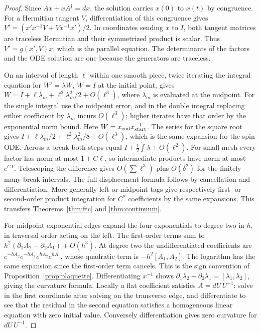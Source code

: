 \documentclass[11pt,reqno]{amsart}
\theoremstyle{definition}
\theoremstyle{remark}
\numberwithin{equation}{section}
\begin{document}
\begin{proof}
Since \(Ax+xA^\dagger=dx\), the solution carries \(x(0)\)
to \(x(t)\) by congruence. For a Hermitian tangent \(V\),
differentiation of this congruence gives
\(V'=(x'x^{-1}V+Vx^{-1}x')/2\).
In coordinates sending \(x\) to \(I\), both tangent matrices are
traceless Hermitian and their symmetrized product is scalar.
Thus \(V'=g(x',V)x\), which is the parallel equation.
The determinants of the factors and the ODE solution are one
because the generators are traceless.

On an interval of length \(\ell\) within one smooth piece, twice
iterating the integral equation for \(W'=\lambda W\), \(W=I\)
at the initial point, gives
\(W=I+\ell\lambda_m+\ell^2\lambda_m^2/2+O(\ell^3)\),
where \(\lambda_m\) is evaluated at the midpoint. For the single
integral use the midpoint error, and in the double integral
replacing either coefficient by \(\lambda_m\) incurs \(O(\ell^3)\);
higher iterates have that order by the exponential norm bound.
Here \(W=x_{\rm end}x_{\rm start}^{-1}\).
The series for the square root gives
\(I+\ell\lambda_m/2+\ell^2\lambda_m^2/8+O(\ell^3)\),
which is the same expansion for the spin ODE.
Across a break both steps equal
\(I+\tfrac12\int\lambda+O(\ell^2)\).
For small mesh every factor has norm at most \(1+C\ell\),
so intermediate products have norm at most \(e^{CT}\).
Telescoping the difference gives \(O(\sum\ell^3)\) plus
\(O(\delta^2)\) for the finitely many break intervals.
The full-displacement formula follows by cancellation and
differentiation. More generally left or midpoint tags
give respectively first- or second-order product integration
for \(C^2\) coefficients by the same expansions.
This transfers Theorems~\ref{thm:ftc} and \ref{thm:continuum}.

For midpoint exponential edges expand the four exponentials to
degree two in \(h\), in traversal order acting on the left.
The first-order terms sum to
\(h^2(\partial_1A_2-\partial_2A_1)+O(h^3)\).
At degree two the undifferentiated coefficients are
\(e^{-hA_2}e^{-hA_1}e^{hA_2}e^{hA_1}\), whose quadratic term
is \(-h^2[A_1,A_2]\). The logarithm has the same expansion
since the first-order term cancels. This is the sign convention of
Proposition~\ref{prop:plaquette}. Differentiating \(x^{-1}\)
shows \(\partial_1\lambda_2-\partial_2\lambda_1=[\lambda_1,\lambda_2]\),
giving the curvature formula. Locally a flat coefficient satisfies
\(A=dU\,U^{-1}\): solve in the first coordinate after solving on
the transverse edge, and differentiate to see that the residual
in the second equation satisfies a homogeneous linear equation
with zero initial value. Conversely differentiation gives zero
curvature for \(dU\,U^{-1}\).
\end{proof}
\end{document}
